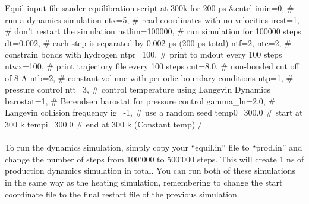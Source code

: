\begin{inpfile}[label=file:equilin]{Equil input file.}{sander}
equilibration script at 300k for 200 ps
&cntrl
  imin=0,           # run a dynamics simulation
  ntx=5,            # read coordinates with no velocities
  irest=1,          # don't restart the simulation
  nstlim=100000,    # run simulation for 100000 steps
  dt=0.002,         # each step is separated by 0.002 ps (200 ps total)
  ntf=2, ntc=2,     # constrain bonds with hydrogen
  ntpr=100,         # print to mdout every 100 steps
  ntwx=100,         # print trajectory file every 100 steps
  cut=8.0,          # non-bonded cut off of 8 A
  ntb=2,            # constant volume with periodic boundary conditions
  ntp=1,            # pressure control
  ntt=3,            # control temperature using Langevin Dynamics
  barostat=1,       # Berendsen barostat for pressure control
  gamma_ln=2.0,     # Langevin collision frequency
  ig=-1,            # use a random seed
  temp0=300.0       # start at 300 k
  tempi=300.0       # end at 300 k (Constant temp)
/

\end{inpfile}

    \paragraph{}
        To run the dynamics simulation, simply copy your \enquote{equil.in} file to \enquote{prod.in} and change the number of steps from 100'000 to 500'000 steps. This will create 1 ns of production dynamics simulation in total. You can run both of these simulations in the same way as the heating simulation, remembering to change the start coordinate file to the final restart file of the previous simulation.